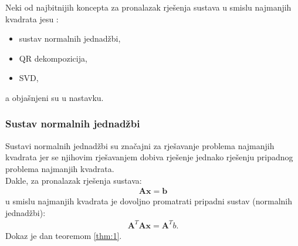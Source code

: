 \documentclass[a4paper,twoside,12pt]{memoir} %
\begin{document}
Neki od najbitnijih koncepta za pronalazak rješenja sustava u smislu najmanjih kvadrata jesu \cite{svd_QR_normalEquations}: 
\begin{itemize}
	\item sustav normalnih jednadžbi,
	\item QR dekompozicija,
	\item SVD,
\end{itemize}
a objašnjeni su u nastavku.

\subsubsection{Sustav normalnih jednadžbi}
Sustavi normalnih jednadžbi su značajni za rješavanje problema najmanjih kvadrata jer se njihovim rješavanjem 
dobiva rješenje jednako rješenju pripadnog problema najmanjih kvadrata. \\
Dakle, za pronalazak rješenja sustava:
\begin{align}
\mathbf{A}\mathbf{x} = \mathbf{b}
\end{align}
u smislu najmanjih kvadrata je dovoljno promatrati pripadni sustav (normalnih jednadžbi):
\begin{align}
\mathbf{A}^T\mathbf{A}\mathbf{x} = \mathbf{A}^Tb.
\end{align}
Dokaz je dan teoremom \ref{thm:1}.
\end{document}
